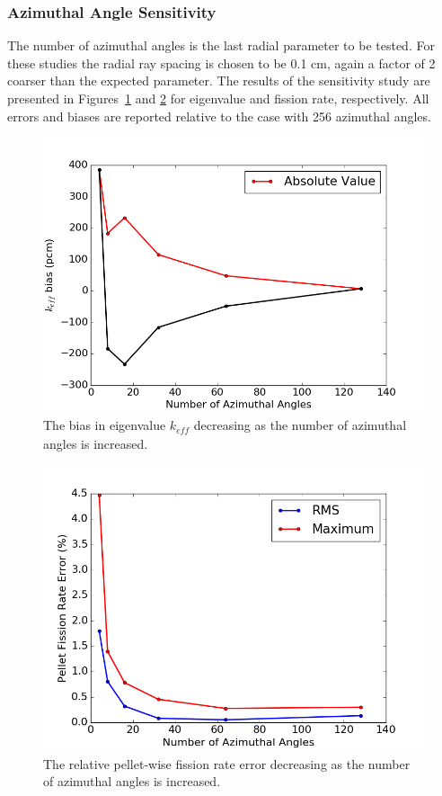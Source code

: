 \newpage
\subsubsection{Azimuthal Angle Sensitivity}

The number of azimuthal angles is the last radial parameter to be tested. For these studies the radial ray spacing is chosen to be 0.1 cm, again a factor of 2 coarser than the expected parameter. The results of the sensitivity study are presented in Figures~\ref{fig:az-angles-pcm} and \ref{fig:az-angles-fr} for eigenvalue and fission rate, respectively. All errors and biases are reported relative to the case with 256 azimuthal angles.

\begin{figure}[h!]
	\centering
	\includegraphics[width=0.7\linewidth]{figures/results/sensitivity/az_angles_pcm.png}
	\caption[]{The bias in eigenvalue $k_{\textit{eff}}$ decreasing as the number of azimuthal angles is increased.}
	\label{fig:az-angles-pcm}
\end{figure}
\begin{figure}[h!]
	\centering
	\includegraphics[width=0.7\linewidth]{figures/results/sensitivity/new_az_angles_fr.png}
	\caption[]{The relative pellet-wise fission rate error decreasing as the number of azimuthal angles is increased.}
	\label{fig:az-angles-fr}
\end{figure}

